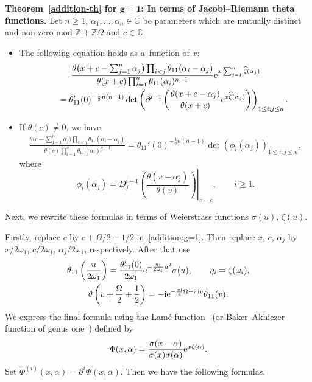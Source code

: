 \documentclass[pdftex]{sigma}
\numberwithin{equation}{section}
\theoremstyle{definition}
\begin{document}
{\bf Theorem~\ref{addition-th} for $\boldsymbol{ g=1}$: In terms of Jacobi--Riemann theta functions.}
Let $n\geq 1$, $\alpha_1,\dots ,\alpha_n \in \mathbb{C}$ be parameters which are mutually distinct and non-zero mod $\mathbb{Z}+\mathbb{Z}\Omega$ and $c\in \mathbb{C}$.
\begin{itemize}
\item[(1)] The following equation holds as a~function of $x$:
\begin{gather}
\frac{\theta\bigl(x+c-\sum_{j=1}^n \alpha_j\bigr)\prod_{i<j}\theta_{11}(\alpha_i-\alpha_j)}
{\theta(x+c)\prod_{i=1}^n\theta_{11}(\alpha_i)^{n-1}}
{\rm e}^{x\sum_{j=1}^n\widehat{\zeta}(\alpha_j)}\nonumber\\
\qquad=
\theta_{11}'(0)^{-\frac{1}{2}n(n-1)}
\det\left(\partial^{i-1}\left(\frac{\theta(x+c-\alpha_j)}{\theta(x+c)}
{\rm e}^{x\widehat{\zeta}(\alpha_j)}\right)\right)_{1\leq i,j\leq n}.
\label{addition:g=1}
\end{gather}


\item[(2)] If $\theta(c)\neq 0$, we have
\begin{gather*}
\frac{\theta\bigl(c-\sum_{j=1}^n \alpha_j\bigr)\prod_{i<j}\theta_{11}(\alpha_i-\alpha_j)}
{\theta(c)\prod_{i=1}^n\theta_{11}(\alpha_i)^{n-1}}
=
\theta_{11}'(0)^{-\frac{1}{2}n(n-1)}
\det\left(
\phi_i(\alpha_j)
\right)_{1\leq i,j\leq n},
\end{gather*}
where
\[
\phi_i(\alpha_j)=\left.D_{j}^{i-1}\left(\frac{\theta(v-\alpha_j)}{\theta(v)}\right)\right|_{v=c},
\qquad
i\geq 1.
\]
\end{itemize}


Next, we rewrite these formulas in terms of Weierstrass functions $\sigma(u)$, $\zeta(u)$.

Firstly, replace $c$ by $c+\Omega/2+1/2$ in~\eqref{addition:g=1}.
Then replace $x$, $c$, $\alpha_j$ by
$x/2\omega_1$, $c/2\omega_1$, $\alpha_j/2\omega_1$, respectively.
After that use
\begin{gather*}
\theta_{11}\left(\frac{u}{2\omega_1}\right)=
\frac{\theta_{11}'(0)}{2\omega_1}{\rm e}^{-\frac{\eta_1}{2\omega_1}u^2}\sigma(u),
\qquad
\eta_i=\zeta(\omega_i),
\\
\theta\left(v+\frac{\Omega}{2}+\frac{1}{2}\right)=-{\rm i}{\rm e}^{-\frac{\pi{\rm i}}{4}\Omega-\pi{\rm i} v}\theta_{11}(v).
\end{gather*}
We express the final formula using the Lam\'e function~\cite{Whittaker-Watson1902} (or Baker--Akhiezer function
of genus one~\cite{Krichever1977}) defined by
\[
\Phi(x,\alpha)=\frac{\sigma(x-\alpha)}{\sigma(x)\sigma(\alpha)}{\rm e}^{x\zeta(\alpha)}.
\]
Set
$
\Phi^{(i)}(x,\alpha)=\partial^i\Phi(x,\alpha)$.
Then we have the following formulas.
\end{document}
